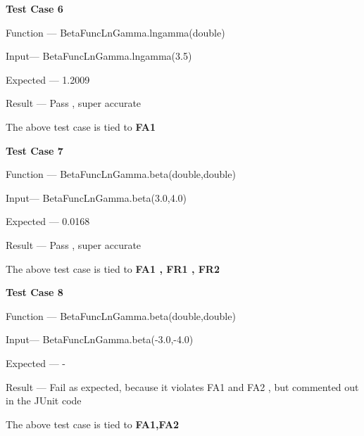 \documentclass[12pt,letterpaper]{article}
\begin{document}
\textbf{Test Case 6}

Function --- BetaFuncLnGamma.lngamma(double)

Input--- BetaFuncLnGamma.lngamma(3.5)

Expected --- 1.2009

Result --- Pass , super accurate

The above test case is tied to \textbf{FA1} \newline

\textbf{Test Case 7}

Function --- BetaFuncLnGamma.beta(double,double)

Input--- BetaFuncLnGamma.beta(3.0,4.0)

Expected --- 0.0168

Result --- Pass , super accurate 

The above test case is tied to \textbf{FA1 , FR1 , FR2} \newline

\textbf{Test Case 8}

Function --- BetaFuncLnGamma.beta(double,double)

Input--- BetaFuncLnGamma.beta(-3.0,-4.0)

Expected --- -\infty

Result --- Fail as expected, because it violates FA1 and FA2 , but commented out in the JUnit code

The above test case is tied to \textbf{FA1,FA2}
\end{document}
